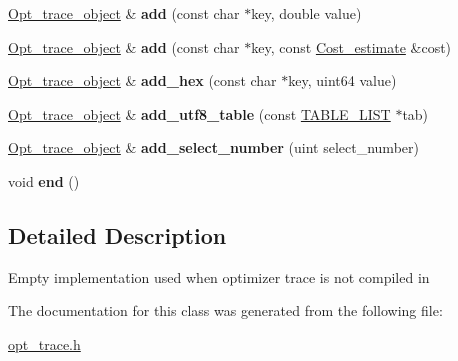\begin{DoxyCompactItemize}
\mbox{\hyperlink{classOpt__trace__object}{Opt\+\_\+trace\+\_\+object}} \& {\bfseries add} (const char $\ast$key, double value)
\item 
\mbox{\label{classOpt__trace__object_a9662f2bed78520070bba8a27aedfae7b}} 
\mbox{\hyperlink{classOpt__trace__object}{Opt\+\_\+trace\+\_\+object}} \& {\bfseries add} (const char $\ast$key, const \mbox{\hyperlink{classCost__estimate}{Cost\+\_\+estimate}} \&cost)
\item 
\mbox{\label{classOpt__trace__object_a9307a47aebd00d5f3c3ea896baef1eb7}} 
\mbox{\hyperlink{classOpt__trace__object}{Opt\+\_\+trace\+\_\+object}} \& {\bfseries add\+\_\+hex} (const char $\ast$key, uint64 value)
\item 
\mbox{\label{classOpt__trace__object_aa47a4d0449a4ecd0fddf15f26fda0ad1}} 
\mbox{\hyperlink{classOpt__trace__object}{Opt\+\_\+trace\+\_\+object}} \& {\bfseries add\+\_\+utf8\+\_\+table} (const \mbox{\hyperlink{structTABLE__LIST}{T\+A\+B\+L\+E\+\_\+\+L\+I\+ST}} $\ast$tab)
\item 
\mbox{\label{classOpt__trace__object_a83b9d829e435b66f3b6e885398b5b75e}} 
\mbox{\hyperlink{classOpt__trace__object}{Opt\+\_\+trace\+\_\+object}} \& {\bfseries add\+\_\+select\+\_\+number} (uint select\+\_\+number)
\item 
\mbox{\label{classOpt__trace__object_a8757a7b8a82a9f263dfb1c32a2441d3b}} 
void {\bfseries end} ()
\end{DoxyCompactItemize}


\subsection{Detailed Description}
Empty implementation used when optimizer trace is not compiled in 

The documentation for this class was generated from the following file\+:\begin{DoxyCompactItemize}
\item 
\mbox{\hyperlink{opt__trace_8h}{opt\+\_\+trace.\+h}}\end{DoxyCompactItemize}
